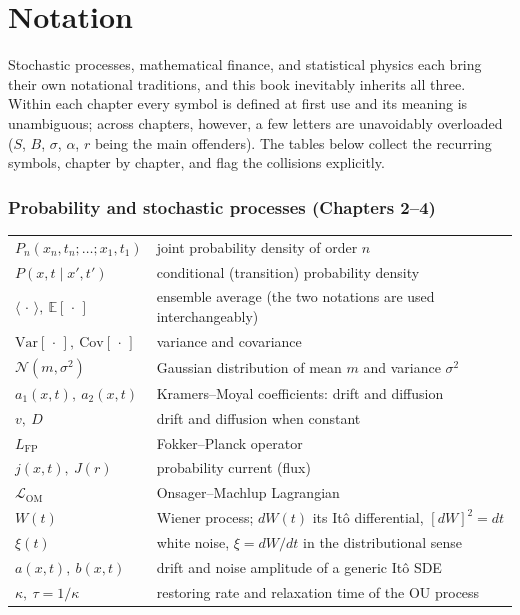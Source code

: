 \chapter*{Notation}

Stochastic processes, mathematical finance, and statistical physics each bring their own notational traditions, and this book inevitably inherits all three.
Within each chapter every symbol is defined at first use and its meaning is unambiguous; across chapters, however, a few letters are unavoidably overloaded ($S$, $B$, $\sigma$, $\alpha$, $r$ being the main offenders).
The tables below collect the recurring symbols, chapter by chapter, and flag the collisions explicitly.

\subsection*{Probability and stochastic processes (Chapters 2--4)}

\begin{center}
\begin{tabular}{l p{10.2cm}}
\hline
$P_n(x_n,t_n;\dots;x_1,t_1)$ & joint probability density of order $n$ \\
$P(x,t\mid x',t')$ & conditional (transition) probability density \\
$\langle\,\cdot\,\rangle,\ \mathbb{E}[\,\cdot\,]$ & ensemble average (the two notations are used interchangeably) \\
$\mathrm{Var}[\,\cdot\,],\ \mathrm{Cov}[\,\cdot\,]$ & variance and covariance \\
$\mathcal{N}(m,\sigma^2)$ & Gaussian distribution of mean $m$ and variance $\sigma^2$ \\
$a_1(x,t),\ a_2(x,t)$ & Kramers--Moyal coefficients: drift and diffusion \\
$v,\ D$ & drift and diffusion when constant \\
$L_{\mathrm{FP}}$ & Fokker--Planck operator \\
$j(x,t),\ J(r)$ & probability current (flux) \\
$\mathcal{L}_{\mathrm{OM}}$ & Onsager--Machlup Lagrangian \\
$W(t)$ & Wiener process; $dW(t)$ its It\^o differential, $[dW]^2=dt$ \\
$\xi(t)$ & white noise, $\xi = dW/dt$ in the distributional sense \\
$a(x,t),\ b(x,t)$ & drift and noise amplitude of a generic It\^o SDE \\
$\kappa,\ \tau=1/\kappa$ & restoring rate and relaxation time of the OU process \\
\hline
\end{tabular}
\end{center}

